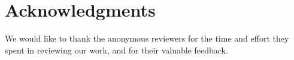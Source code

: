 \documentclass[11pt,a4paper]{article}
\begin{document}
\section*{Acknowledgments}

We would like to thank the anonymous reviewers for the time and effort they spent in reviewing our work, and for
their valuable feedback.



\end{document}
